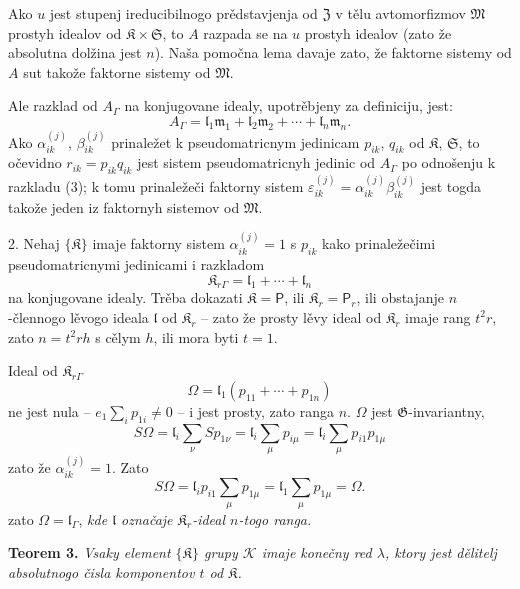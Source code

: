 \documentclass[11pt]{article}
\begin{document}
Ako \(u\) jest stupenj ireducibilnogo prědstavjenja od \(\mathfrak Z\) v tělu avtomorfizmov \(\mathfrak M\) prostyh idealov od \(\mathfrak K\times\mathfrak S\), to \(A\) razpada se na \(u\) prostyh idealov (zato že absolutna dolžina jest \(n\)). Naša pomočna lema davaje zato, že faktorne sistemy od \(A\) sut takože faktorne sistemy od \(\mathfrak M\).

Ale razklad od \(A_\Gamma\) na konjugovane idealy, upotrěbjeny za definiciju, jest:
\[
\tag{3}
A_\Gamma=\mathfrak l_1\mathfrak m_1+\mathfrak l_2\mathfrak m_2+\cdots+\mathfrak l_n\mathfrak m_n.
\]
Ako \(\alpha_{ik}^{(j)}\), \(\beta_{ik}^{(j)}\) prinaležet k pseudomatricnym jedinicam \(p_{ik}\), \(q_{ik}\) od \(\mathfrak K\), \(\mathfrak S\), to očevidno \(r_{ik}=p_{ik}q_{ik}\) jest sistem pseudomatricnyh jedinic od \(A_\Gamma\) po odnošenju k razkladu (3); k tomu prinaležeči faktorny sistem \(\varepsilon_{ik}^{(j)}=\alpha_{ik}^{(j)}\beta_{ik}^{(j)}\) jest togda takože jeden iz faktornyh sistemov od \(\mathfrak M\).

2. Nehaj \(\{\mathfrak K\}\) imaje faktorny sistem \(\alpha_{ik}^{(j)}=1\) s \(p_{ik}\) kako prinaležečimi pseudomatricnymi jedinicami i razkladom
\[
\mathfrak K_{r\Gamma}=\mathfrak l_1+\cdots+\mathfrak l_n
\]
na konjugovane idealy. Trěba dokazati \(\mathfrak K=\mathsf P\), ili \(\mathfrak K_r=\mathsf P_r\), ili obstajanje \(n\)-člennogo lěvogo ideala \(\mathfrak l\) od \(\mathfrak K_r\) -- zato že prosty lěvy ideal od \(\mathfrak K_r\) imaje rang \(t^2r\), zato \(n=t^2rh\) s cělym \(h\), ili mora byti \(t=1\).

Ideal od \(\mathfrak K_{r\Gamma}\)
\[
\Omega=\mathfrak l_1(p_{11}+\cdots+p_{1n})
\]
ne jest nula -- \(e_1\sum_i p_{1i}\ne0\) -- i jest prosty, zato ranga \(n\). \(\Omega\) jest \(\mathfrak G\)-invariantny,
\[
S\Omega
=\mathfrak l_i\sum_\nu S p_{1\nu}
=\mathfrak l_i\sum_\mu p_{i\mu}
=\mathfrak l_i\sum_\mu p_{i1}p_{1\mu}
\]
zato že \(\alpha_{ik}^{(j)}=1\). Zato
\[
S\Omega=\mathfrak l_ip_{i1}\sum_\mu p_{1\mu}
=\mathfrak l_1\sum_\mu p_{1\mu}
=\Omega.
\]
zato \(\Omega=\mathfrak l_\Gamma\), \emph{kde \(\mathfrak l\) označaje \(\mathfrak K_r\)-ideal \(n\)-togo ranga.}

\textbf{Teorem 3.} \emph{Vsaky element \(\{\mathfrak K\}\) grupy \(\mathscr K\) imaje konečny red \(\lambda\), ktory jest dělitelj absolutnogo čisla komponentov \(t\) od \(\mathfrak K\).}
\end{document}
